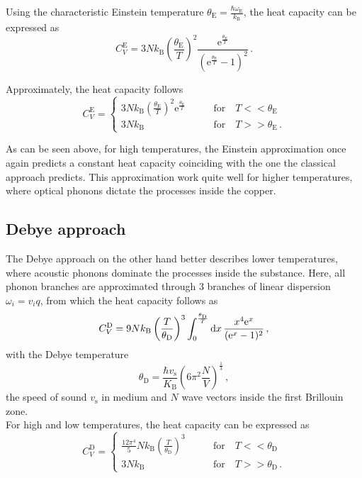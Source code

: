 Using the characteristic Einstein temperature $\theta_\text{E} = \frac{\hbar \omega_\text{E}}{k_\text{B}}$, the heat capacity can be expressed as
\begin{equation}
    C^\text{E}_V = 3 N k_\text{B} \left(\frac{\theta_\text{E}}{T} \right)^2 \frac{\text{e}^{\frac{\theta_\text{E}}{T}}}{\left(\text{e}^{\frac{\theta_\text{E}}{T}} - 1 \right)^2} \,.
    \label{eq:einsteinheatcap}
\end{equation}

Approximately, the heat capacity follows
\begin{equation*}
    C^\text{E}_V = \begin{cases}
        3 N k_\text{B} \left(\frac{\theta_\text{E}}{T} \right)^2 \text{e}^{\frac{\theta_\text{E}}{T}} &\qquad \text{for} \quad T << \theta_\text{E} \\ 
        3 N k_\text{B} &\qquad \text{for} \quad T >> \theta_\text{E} \,.
    \end{cases} 
\end{equation*}

As can be seen above, for high temperatures, the Einstein approximation once again predicts a constant heat capacity coinciding with the one the classical approach predicts.
This approximation work quite well for higher temperatures, where optical phonons dictate the processes inside the copper. \cite{}

\subsection{Debye approach}

The Debye approach on the other hand better describes lower temperatures, where acoustic phonons dominate the processes inside the substance.
Here, all phonon branches are approximated through $3$ branches of linear dispersion $\omega_i = v_i q$,  from which the heat capacity follows as
\begin{equation*}
    C^\text{D}_V = 9 N k_\text{B} \left( \frac{T}{\theta_\text{D}} \right)^3 \int^{\frac{\theta_\text{D}}{T}}_0 \mathrm{d} x \, \frac{x^4 \text{e}^x}{(\text{e}^x -1)^2} \,,
\end{equation*}
with the Debye temperature
\begin{equation*}
    \theta_\text{D} = \frac{\hbar v_\text{s}}{K_\text{B}} \left(6 \pi^2 \frac{N}{V}\right)^{\frac{1}{3}} \,,
\end{equation*}
the speed of sound $v_\text{s}$ in medium and $N$ wave vectors inside the first Brillouin zone. \\

For high and low temperatures, the heat capacity can be expressed as
\begin{equation*}
    C^\text{D}_V= \begin{cases}
        \frac{12 \pi^4}{5} N k_\text{B} \left(\frac{T} {\theta_\text{D}}\right)^3 &\qquad \text{for} \quad T << \theta_\text{D} \\ 
        3 N k_\text{B} &\qquad \text{for} \quad T >> \theta_\text{D} \,.
    \end{cases} 
\end{equation*}